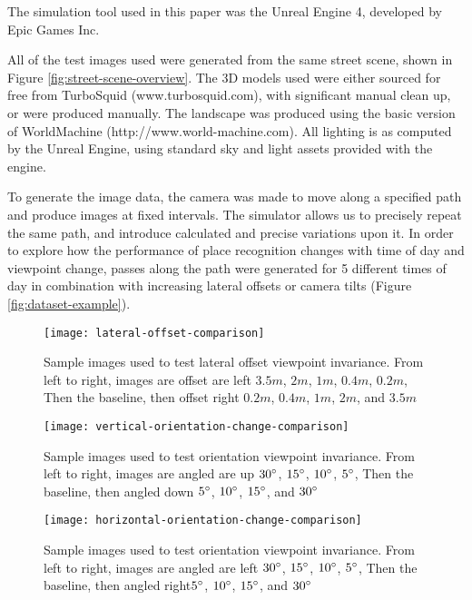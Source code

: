 \documentclass[letterpaper, 10 pt, conference]{ieeeconf}  %
\begin{document}
The simulation tool used in this paper was the Unreal Engine 4, developed by Epic Games Inc.

All of the test images used were generated from the same street scene, shown in Figure \ref{fig:street-scene-overview}. The 3D models used were either sourced for free from TurboSquid (www.turbosquid.com), with significant manual clean up, or were produced manually. The landscape was produced using the basic version of WorldMachine (http://www.world-machine.com). All lighting is as computed by the Unreal Engine, using standard sky and light assets provided with the engine.

To generate the image data, the camera was made to move along a specified path and produce images at fixed intervals.
The simulator allows us to precisely repeat the same path, and introduce calculated and precise variations upon it.
In order to explore how the performance of place recognition changes with time of day and viewpoint change, passes along the path were generated for 5 different times of day in combination with increasing lateral offsets or camera tilts (Figure \ref{fig:dataset-example}).

\begin{figure*}[t]
    \texttt{[image: lateral-offset-comparison]}
    \caption{Sample images used to test lateral offset viewpoint invariance. From left to right, images are offset are left $3.5m$, $2m$, $1m$, $0.4m$, $0.2m$, Then the baseline, then offset right $0.2m$, $0.4m$, $1m$, $2m$, and $3.5m$}
    \label{fig:dataset-offset-example}
\end{figure*}

\begin{figure*}[t]
    \texttt{[image: vertical-orientation-change-comparison]}
    \caption{Sample images used to test orientation viewpoint invariance. From left to right, images are angled are up $30\degree$, $15\degree$, $10\degree$, $5\degree$, Then the baseline, then angled down $5\degree$, $10\degree$, $15\degree$, and $30\degree$}
    \label{fig:dataset-pitch-example}
\end{figure*}

\begin{figure*}[t]
    \texttt{[image: horizontal-orientation-change-comparison]}
    \caption{Sample images used to test orientation viewpoint invariance. From left to right, images are angled are left $30\degree$, $15\degree$, $10\degree$, $5\degree$, Then the baseline, then angled right$5\degree$, $10\degree$, $15\degree$, and $30\degree$}
    \label{fig:dataset-yaw-example}
\end{figure*}
\end{document}
